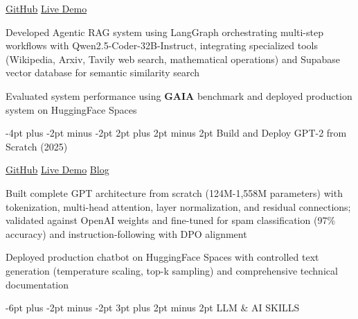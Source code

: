 \documentclass[10pt]{article}
\makeatletter
\providecommand{\tightlist}{%
  \setlength{\itemsep}{0pt}\setlength{\parskip}{0pt}}
\let\olditemize\itemize
\let\endolditemize\enditemize
\renewenvironment{itemize}{%
  \olditemize
  \setlength{\itemsep}{1pt}
  \setlength{\parskip}{0pt}
  \setlength{\parsep}{0pt}
  \setlength{\topsep}{2pt}
  \setlength{\partopsep}{0pt}
}{%
  \endolditemize
}
\renewcommand\subsection{\@startsection{subsection}{2}{\z@}%
  {-6pt plus -2pt minus -2pt}%
  {3pt plus 2pt minus 2pt}%
  {\normalfont\large\bfseries}}
\renewcommand\subsubsection{\@startsection{subsubsection}{3}{\z@}%
  {-4pt plus -2pt minus -2pt}%
  {2pt plus 2pt minus 2pt}%
  {\normalfont\normalsize\bfseries}}
\makeatother
\begin{document}
\href{https://huggingface.co/spaces/doggdad/agent_final_project/tree/main}{GitHub}
\textbar{}
\href{https://huggingface.co/spaces/doggdad/agent_final_project}{Live
Demo}

\begin{itemize}
\tightlist
\item
  Developed Agentic RAG system using LangGraph orchestrating multi-step workflows with Qwen2.5-Coder-32B-Instruct, integrating specialized tools (Wikipedia, Arxiv, Tavily web search, mathematical operations) and Supabase vector database for semantic similarity search
\item
  Evaluated system performance using \textbf{GAIA} benchmark and deployed production system on HuggingFace Spaces
\end{itemize}

\subsubsection{Build and Deploy GPT-2 from Scratch
(2025)}\label{build-and-deploy-gpt-2-from-scratch-2025}

\href{https://github.com/daddyofadoggy/InstructGPT-from-scratch}{GitHub}
\textbar{}
\href{https://huggingface.co/spaces/doggdad/InstructGPTFinetuned}{Live
Demo} \textbar{}
\href{https://daddyofadoggy.github.io/blog/posts/LLM-From-Scratch/}{Blog}

\begin{itemize}
\tightlist
\item
  Built complete GPT architecture from scratch (124M-1,558M parameters) with tokenization, multi-head attention, layer normalization, and residual connections; validated against OpenAI weights and fine-tuned for spam classification (97\% accuracy) and instruction-following with DPO alignment
\item
  Deployed production chatbot on HuggingFace Spaces with controlled text generation (temperature scaling, top-k sampling) and comprehensive technical documentation
\end{itemize}

\subsection{LLM \& AI SKILLS}\label{llm-ai-skills}
\end{document}

